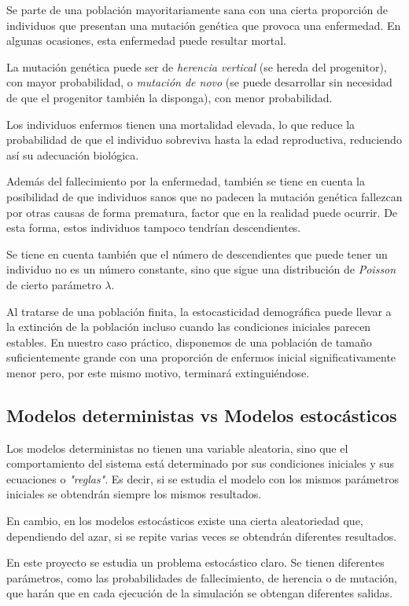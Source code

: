 \documentclass[graybox]{SNmult}
\begin{document}
	Se parte de una población mayoritariamente sana con una cierta proporción de individuos que presentan una mutación genética que provoca una enfermedad. En algunas ocasiones, esta enfermedad puede resultar mortal. 
	
	La mutación genética puede ser de \textit{herencia vertical} (se hereda del progenitor), con mayor probabilidad, o \textit{mutación de novo} (se puede desarrollar sin necesidad de que el progenitor también la disponga), con menor probabilidad. 
	
	Los individuos enfermos tienen una mortalidad elevada, lo que reduce la probabilidad de que el individuo sobreviva hasta la edad reproductiva, reduciendo así su adecuación biológica. 
	

	Además del fallecimiento por la enfermedad, también se tiene en cuenta la posibilidad de que individuos sanos que no padecen la mutación genética fallezcan por otras causas de forma prematura, factor que en la realidad puede ocurrir. De esta forma, estos individuos tampoco tendrían descendientes.
	
	Se tiene en cuenta también que el número de descendientes que puede tener un individuo no es un número constante, sino que sigue una distribución de \textit{Poisson} de cierto parámetro $\lambda$. 
	
	Al tratarse de una población finita, la estocasticidad demográfica puede llevar a la extinción de la población incluso cuando las condiciones iniciales parecen estables. En nuestro caso práctico, disponemos de una población de tamaño suficientemente grande con una proporción de enfermos inicial significativamente menor pero, por este mismo motivo, terminará extinguiéndose. 
 
	\subsection{Modelos deterministas vs Modelos estocásticos}
	Los modelos deterministas no tienen una variable aleatoria, sino que el comportamiento del sistema está determinado por sus condiciones iniciales y sus ecuaciones o \textit{"reglas"}. Es decir, si se estudia el modelo con los mismos parámetros iniciales se obtendrán siempre los mismos resultados. 
	
	En cambio, en los modelos estocásticos existe una cierta aleatoriedad que, dependiendo del azar, si se repite varias veces se obtendrán diferentes resultados. 
	
	En este proyecto se estudia un problema estocástico claro. Se tienen diferentes parámetros, como las probabilidades de fallecimiento, de herencia o de mutación, que harán que en cada ejecución de la simulación se obtengan diferentes salidas. 
	
\end{document}
